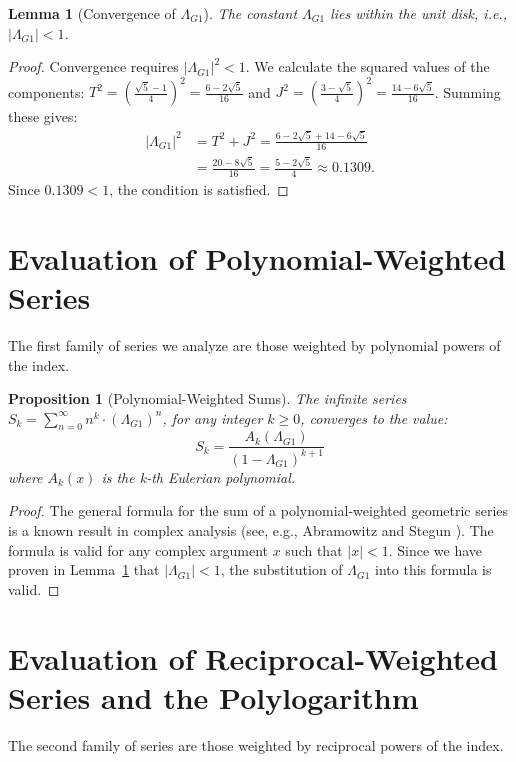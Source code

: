 \documentclass{amsart}
\theoremstyle{plain}
\newtheorem{proposition}[theorem]{Proposition} %
\newtheorem{lemma}[theorem]{Lemma}
\theoremstyle{definition}
\theoremstyle{remark}
\newcommand{\LambdaG}{\Lambda_{G1}}
\begin{document}
\begin{lemma}[Convergence of $\LambdaG$]
\label{lem:convergence}
The constant $\LambdaG$ lies within the unit disk, i.e., $|\LambdaG| < 1$.
\end{lemma}
\begin{proof}
Convergence requires $|\LambdaG|^2 < 1$. We calculate the squared values of the components:
$T^2 = \left(\frac{\sqrt{5}-1}{4}\right)^2 = \frac{6-2\sqrt{5}}{16}$ and $J^2 = \left(\frac{3-\sqrt{5}}{4}\right)^2 = \frac{14-6\sqrt{5}}{16}$.
Summing these gives:
\begin{align*}
    |\LambdaG|^2 &= T^2+J^2 = \frac{6-2\sqrt{5} + 14-6\sqrt{5}}{16} \\
                 &= \frac{20-8\sqrt{5}}{16} = \frac{5-2\sqrt{5}}{4} \approx 0.1309.
\end{align*}
Since $0.1309 < 1$, the condition is satisfied.
\end{proof}

\section{Evaluation of Polynomial-Weighted Series}
The first family of series we analyze are those weighted by polynomial powers of the index.

\begin{proposition}[Polynomial-Weighted Sums]
The infinite series $S_k = \sum_{n=0}^{\infty} n^k \cdot (\LambdaG)^n$, for any integer $k \ge 0$, converges to the value:
$$S_k = \frac{A_k(\LambdaG)}{(1-\LambdaG)^{k+1}}$$
where $A_k(x)$ is the k-th Eulerian polynomial.
\end{proposition}
\begin{proof}
The general formula for the sum of a polynomial-weighted geometric series is a known result in complex analysis (see, e.g., Abramowitz and Stegun \cite{AandS}). The formula is valid for any complex argument $x$ such that $|x|<1$. Since we have proven in Lemma~\ref{lem:convergence} that $|\LambdaG|<1$, the substitution of $\LambdaG$ into this formula is valid.
\end{proof}

\section{Evaluation of Reciprocal-Weighted Series and the Polylogarithm}
The second family of series are those weighted by reciprocal powers of the index.
\end{document}
